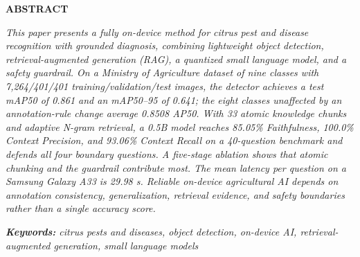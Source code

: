 \documentclass[10pt,twocolumn,a4paper]{article}
\begin{document}

\begin{center}\bfseries ABSTRACT\end{center}
\noindent\textit{This paper presents a fully on-device method for citrus pest and disease recognition with grounded diagnosis, combining lightweight object detection, retrieval-augmented generation (RAG), a quantized small language model, and a safety guardrail. On a Ministry of Agriculture dataset of nine classes with 7,264/401/401 training/validation/test images, the detector achieves a test mAP50 of 0.861 and an mAP50–95 of 0.641; the eight classes unaffected by an annotation-rule change average 0.8508 AP50. With 33 atomic knowledge chunks and adaptive N-gram retrieval, a 0.5B model reaches 85.05\% Faithfulness, 100.0\% Context Precision, and 93.06\% Context Recall on a 40-question benchmark and defends all four boundary questions. A five-stage ablation shows that atomic chunking and the guardrail contribute most. The mean latency per question on a Samsung Galaxy A33 is 29.98 s. Reliable on-device agricultural AI depends on annotation consistency, generalization, retrieval evidence, and safety boundaries rather than a single accuracy score.}\par

\vspace{6pt}\noindent\textit{\textbf{Keywords:} citrus pests and diseases, object detection, on-device AI, retrieval-augmented generation, small language models}\par
\end{document}
